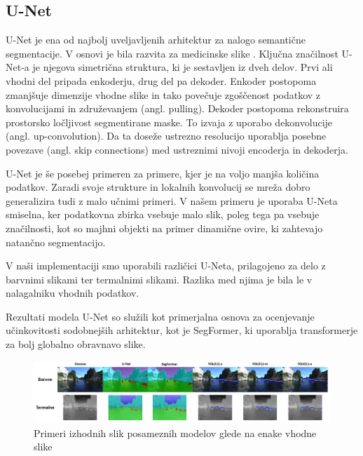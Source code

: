 \documentclass[10pt,twocolumn,letterpaper]{article}
\begin{document}
\subsection{U-Net}
U-Net je ena od najbolj uveljavljenih arhitektur za nalogo semantične segmentacije. V osnovi je bila razvita za medicinske slike \cite{ronneberger2015unetconvolutionalnetworksbiomedical}. Ključna značilnost U-Net-a je njegova simetrična struktura, ki je sestavljen iz dveh delov. Prvi ali vhodni del pripada enkoderju, drug del pa dekoder. Enkoder postopoma zmanjšuje dimenzije vhodne slike in tako povečuje zgoščenost podatkov z  konvolucijami in združevanjem (angl. pulling). 
Dekoder postopoma rekonstruira prostorsko ločljivost segmentirane maske. To izvaja z uporabo dekonvolucije (angl. up-convolution). Da ta doseže ustrezno resolucijo uporablja posebne povezave (angl. skip connections) med ustreznimi nivoji encoderja in dekoderja. 

U-Net je še posebej primeren za primere, kjer je na voljo manjša količina podatkov. Zaradi svoje strukture in lokalnih konvolucij se mreža dobro generalizira tudi z malo učnimi primeri. V našem primeru je uporaba U-Neta smiselna, ker podatkovna zbirka vsebuje malo slik, poleg tega pa vsebuje značilnosti, kot so majhni objekti na primer dinamične ovire, ki zahtevajo natančno segmentacijo.\cite{futrega2021optimizedunetbraintumor}

V naši implementaciji smo uporabili različici U-Neta, prilagojeno za delo z barvnimi slikami ter termalnimi slikami. Razlika med njima je bila le v nalagalniku vhodnih podatkov.

Rezultati modela U-Net so služili kot primerjalna osnova za ocenjevanje učinkovitosti sodobnejših arhitektur, kot je SegFormer, ki uporablja transformerje za bolj globalno obravnavo slike.

\begin{figure}[t] %
    \centering
    \includegraphics[width=\textwidth]{Slike/teaser2.PNG} %
    \caption{Primeri izhodnih slik posameznih modelov glede na enake vhodne slike}
    \label{fig:prikaz_modelov_velikaSlika} %
\end{figure}
\end{document}
